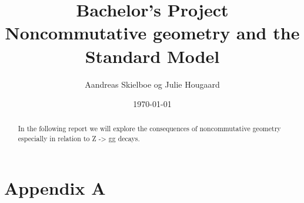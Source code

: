\documentclass[11pt,a4paper,titlepage]{article}
\numberwithin{equation}{section}
\begin{document}
\title{Bachelor's Project\\Noncommutative geometry and the Standard Model}
\author{Aandreas Skielboe og Julie Hougaard}
\date{\today}
\maketitle
{}

\begin{abstract}
In the following report we will explore the consequences of noncommutative geometry especially in relation to Z -> gg decays.
\end{abstract}

\clearpage
\tableofcontents
\clearpage


















\clearpage



\clearpage



\section{Appendix A}







\end{document}
